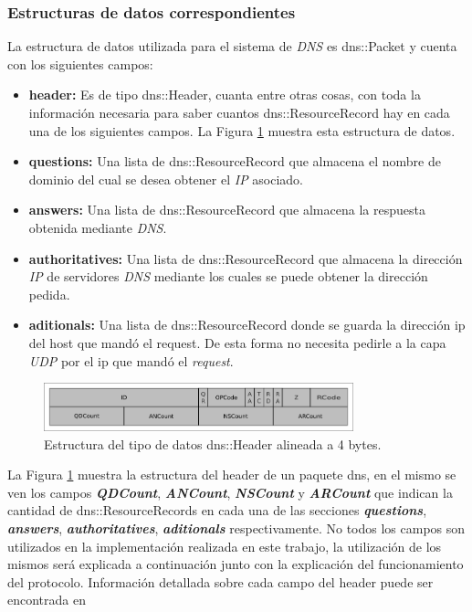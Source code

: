 \documentclass[10pt,a4paper]{article}
\begin{document}
\subsubsection{Estructuras de datos correspondientes}
La estructura de datos utilizada para el sistema de \textit{DNS} es dns::Packet y cuenta con los siguientes campos:
\begin{itemize}
\item \textbf{header: } Es de tipo dns::Header, cuanta entre otras cosas, con toda la información necesaria para saber cuantos dns::ResourceRecord hay en cada una de los siguientes campos. La Figura \ref{figure: dns header} muestra esta estructura de datos.
\item \textbf{questions: } Una lista de dns::ResourceRecord que almacena el nombre de dominio del cual se desea obtener el \textit{IP} asociado.
\item \textbf{answers: } Una lista de dns::ResourceRecord que almacena la respuesta obtenida mediante \textit{DNS}.
\item \textbf{authoritatives: } Una lista de dns::ResourceRecord que almacena la dirección \textit{IP} de servidores \textit{DNS} mediante los cuales se puede obtener la dirección pedida.
\item \textbf{aditionals: } Una lista de dns::ResourceRecord donde se guarda la dirección ip del host que mandó el request. De esta forma no necesita pedirle a la capa \textit{UDP} por el ip que mandó el \textit{request}.
\end{itemize}

\begin{figure}[!htb]
    \centering
    \includegraphics[width = 0.8\textwidth]{img/png/dns-header.png}
    \caption{Estructura del tipo de datos dns::Header alineada a 4 bytes.}
    \label{figure: dns header}
\end{figure}

La Figura \ref{figure: dns header} muestra la estructura del header de un paquete dns, en el mismo se ven los campos \textbf{\textit{QDCount}}, \textbf{\textit{ANCount}}, \textbf{\textit{NSCount}} y \textbf{\textit{ARCount}} que indican la cantidad de dns::ResourceRecords en cada una de las secciones \textbf{\textit{questions}}, \textbf{\textit{answers}}, \textbf{\textit{authoritatives}}, \textbf{\textit{aditionals}} respectivamente. No todos los campos son utilizados en la implementación realizada en este trabajo, la utilización de los mismos será explicada a continuación junto con la explicación del funcionamiento del protocolo. Información detallada sobre cada campo del header puede ser encontrada en \cite{dnsheader}\\
\end{document}
